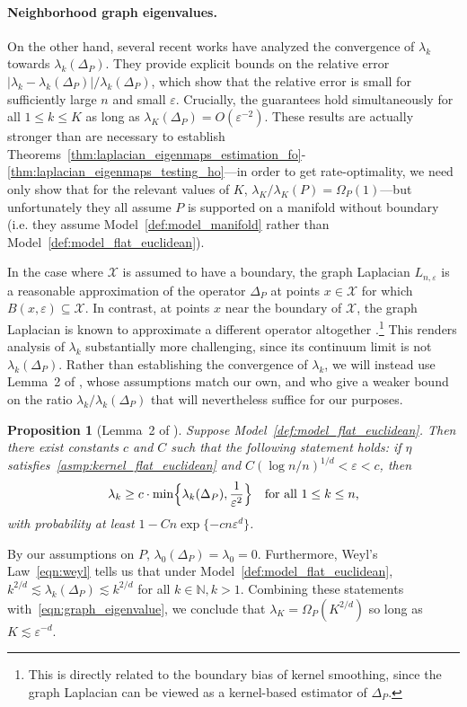 \documentclass{article}
\newcommand{\1}{\mathbf{1}}
\newcommand{\mc}[1]{\mathcal{#1}}
\theoremstyle{alden}
\theoremstyle{aldenthm}
\newtheorem{proposition}{Proposition}
\theoremstyle{definition}
\theoremstyle{remark}
\begin{document}
\paragraph{Neighborhood graph eigenvalues.}
On the other hand, several recent works \citep{burago2014,garciatrillos18,calder2019} have analyzed the convergence of $\lambda_{k}$ towards $\lambda_{k}(\Delta_P)$. They provide explicit bounds on the relative error $|\lambda_{k} - \lambda_{k}(\Delta_P)|/\lambda_{k}(\Delta_P)$, which show that the relative error is small for sufficiently large $n$ and small $\varepsilon$. Crucially, the guarantees hold simultaneously for all $1 \leq k \leq K$ as long as $\lambda_{K}(\Delta_P) = O(\varepsilon^{-2})$. These results are actually stronger than are necessary to establish Theorems~\ref{thm:laplacian_eigenmaps_estimation_fo}-\ref{thm:laplacian_eigenmaps_testing_ho}---in order to get rate-optimality, we need only show that for the relevant values of $K$, $\lambda_{K}/\lambda_K(P) = \Omega_P(1)$---but unfortunately they all assume $P$ is supported on a manifold without boundary (i.e. they assume Model~\ref{def:model_manifold} rather than Model~\ref{def:model_flat_euclidean}). 

In the case where $\mc{X}$ is assumed to have a boundary, the graph Laplacian $L_{n,\varepsilon}$ is a reasonable approximation of the operator $\Delta_P$ at points $x \in \mc{X}$ for which $B(x,\varepsilon) \subseteq \mc{X}$. In contrast, at points $x$ near the boundary of $\mc{X}$, the graph Laplacian is known to approximate a different operator altogether \citep{belkin2012}.\footnote{This is directly related to the boundary bias of kernel smoothing, since the graph Laplacian can be viewed as a kernel-based estimator of $\Delta_P$.} This renders analysis of $\lambda_k$ substantially more challenging, since its continuum limit is not $\lambda_k(\Delta_P)$.  Rather than establishing the convergence of $\lambda_k$, we will instead use Lemma~2 of \cite{green2021}, whose assumptions match our own, and who give a weaker bound on the ratio $\lambda_k/\lambda_k(\Delta_P)$ that will nevertheless suffice for our purposes. 

\begin{proposition}[Lemma~2 of \cite{green2021}]
	\label{prop:graph_eigenvalue}
	Suppose Model~\ref{def:model_flat_euclidean}. Then there exist constants $c$ and $C$ such that the following statement holds: if $\eta$ satisfies~\ref{asmp:kernel_flat_euclidean} and $C(\log n/n)^{1/d} < \varepsilon < c$, then
	\begin{equation}
	\label{eqn:graph_eigenvalue}
	\lambda_k \geq c \cdot \min\Bigl\{\lambda_k(\Delta_P), \frac{1}{\varepsilon^{2}} \Bigr\} \quad \textrm{for all $1 \leq k \leq n$,}
	\end{equation}
	with probability at least $1 - Cn\exp\{-c n\varepsilon^d\}$. 
\end{proposition}
By our assumptions on $P$, $\lambda_0(\Delta_P) = \lambda_0 = 0$. Furthermore, Weyl's Law~\eqref{eqn:weyl} tells us that under Model~\ref{def:model_flat_euclidean}, $k^{2/d} \lesssim \lambda_{k}(\Delta_P) \lesssim k^{2/d}$ for all $k \in \mathbb{N}, k > 1$. Combining these statements with~\eqref{eqn:graph_eigenvalue}, we conclude that $\lambda_{K} = \Omega_P(K^{2/d})$ so long as $K \lesssim \varepsilon^{-d}$. 
\end{document}
